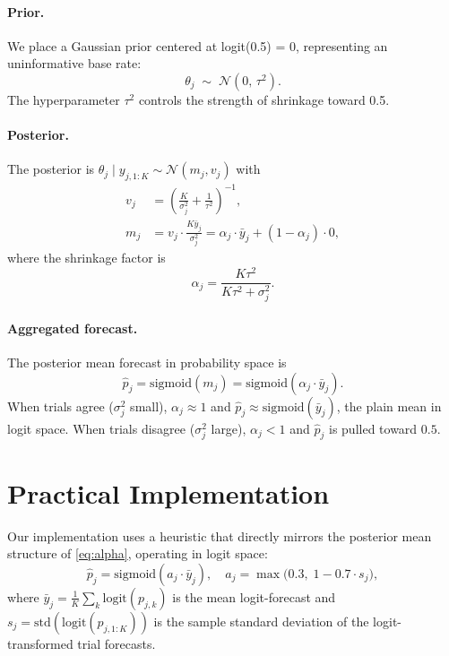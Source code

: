 \documentclass[11pt]{article}
\begin{document}
\paragraph{Prior.}
We place a Gaussian prior centered at logit(0.5) = 0, representing an
uninformative base rate:
\begin{equation}
  \theta_j \;\sim\; \mathcal{N}(0,\, \tau^2).
\end{equation}
The hyperparameter $\tau^2$ controls the strength of shrinkage toward 0.5.

\paragraph{Posterior.}
The posterior is $\theta_j \mid y_{j,1:K} \sim \mathcal{N}(m_j, v_j)$ with
\begin{align}
  v_j &= \left(\frac{K}{\sigma_j^2} + \frac{1}{\tau^2}\right)^{-1}, \\
  m_j &= v_j \cdot \frac{K \bar{y}_j}{\sigma_j^2}
       = \alpha_j \cdot \bar{y}_j + (1 - \alpha_j) \cdot 0,
\end{align}
where the shrinkage factor is
\begin{equation}
  \alpha_j = \frac{K \tau^2}{K \tau^2 + \sigma_j^2}.
  \label{eq:alpha}
\end{equation}

\paragraph{Aggregated forecast.}
The posterior mean forecast in probability space is
\begin{equation}
  \hat{p}_j = \mathrm{sigmoid}(m_j) = \mathrm{sigmoid}(\alpha_j \cdot \bar{y}_j).
\end{equation}
When trials agree ($\sigma_j^2$ small), $\alpha_j \approx 1$ and $\hat{p}_j \approx
\mathrm{sigmoid}(\bar{y}_j)$, the plain mean in logit space.
When trials disagree ($\sigma_j^2$ large), $\alpha_j < 1$ and $\hat{p}_j$ is
pulled toward $0.5$.

\section{Practical Implementation}

Our implementation uses a heuristic that directly mirrors the posterior mean
structure of \eqref{eq:alpha}, operating in logit space:
\begin{equation}
  \hat{p}_j = \mathrm{sigmoid}(a_j \cdot \bar{y}_j),
  \quad a_j = \max\!\bigl(0.3,\; 1 - 0.7 \cdot s_j\bigr),
  \label{eq:heuristic}
\end{equation}
where $\bar{y}_j = \frac{1}{K}\sum_k \mathrm{logit}(p_{j,k})$ is the mean
logit-forecast and $s_j = \mathrm{std}(\mathrm{logit}(p_{j,1:K}))$ is the
sample standard deviation of the logit-transformed trial forecasts.
\end{document}

